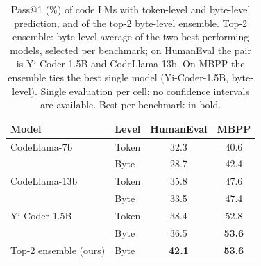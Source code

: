 \begin{table}[t]
\caption{Pass@1 (\%) of code LMs with token-level and byte-level prediction, and of the top-2 byte-level ensemble. Top-2 ensemble: byte-level average of the two best-performing models, selected per benchmark; on HumanEval the pair is Yi-Coder-1.5B and CodeLlama-13b. On MBPP the ensemble ties the best single model (Yi-Coder-1.5B, byte-level). Single evaluation per cell; no confidence intervals are available. Best per benchmark in bold.}
\label{tab:code}
\begin{center}
\small
\begin{tabular}{llcc}
\toprule
Model & Level & HumanEval & MBPP \\
\midrule
CodeLlama-7b & Token & 32.3 & 40.6 \\
 & Byte & 28.7 & 42.4 \\
\addlinespace[2pt]
CodeLlama-13b & Token & 35.8 & 47.6 \\
 & Byte & 33.5 & 47.4 \\
\addlinespace[2pt]
Yi-Coder-1.5B & Token & 38.4 & 52.8 \\
 & Byte & 36.5 & \textbf{53.6} \\
\midrule
Top-2 ensemble (ours) & Byte & \textbf{42.1} & \textbf{53.6} \\
\bottomrule
\end{tabular}
\end{center}
\end{table}
